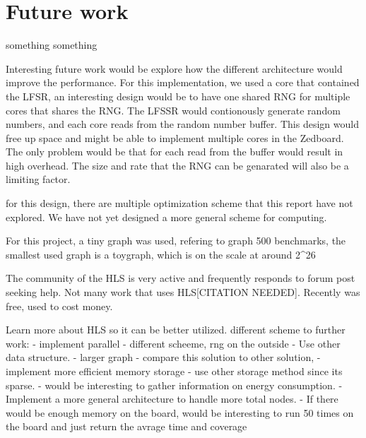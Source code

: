 \chapter{Future work} \label{futureWork}
something something

Interesting future work would be explore how the different architecture would improve the performance. For this implementation, we used a core that contained the LFSR, an interesting design would be to have one shared RNG for multiple cores that shares the RNG. The LFSSR would contionously generate random numbers, and each core reads from the random number buffer. This design would free up space and might be able to implement multiple cores in the Zedboard. The only problem would be that for each read from the buffer would result in high overhead. The size and rate that the RNG can be genarated will also be a limiting factor.

for this design, there are multiple optimization scheme that this report have not explored. We have not yet designed a more general scheme for computing. 

For this project, a tiny graph was used, refering to graph 500 benchmarks, the smallest used graph is a toygraph, which is on the scale at around 2^26

The community of the HLS is very active and frequently responds to forum post seeking help.	Not many work that uses HLS[CITATION NEEDED]. Recently was free, used to cost money.


Learn more about HLS so it can be better utilized. 
different scheme to further work:
- implement parallel
- different scheeme, rng on the outside
- Use other data structure.
- larger graph
- compare this solution to other solution, 
- implement more efficient memory storage
- use other storage method since its sparse. 
- would be interesting to gather information on  energy consumption.
- Implement a more general architecture to handle more total nodes.
- If  there would be enough memory on the board, would be interesting to run 50 times on the board and just return the avrage time and coverage
